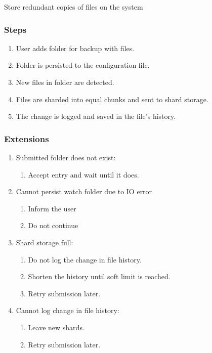 \documentclass[11pt, a4paper, twocolumn, twoside]{report}
\begin{document}
Store redundant copies of files on the system

\subsubsection{Steps}

\begin{enumerate}
 \item User adds folder for backup with files.
 \item Folder is persisted to the configuration file.
 \item New files in folder are detected.
 \item Files are sharded into equal chunks and sent to shard storage.
 \item The change is logged and saved in the file's history.
\end{enumerate}

\subsubsection{Extensions}
\begin{enumerate}
  \item Submitted folder does not exist:
	\begin{enumerate}
	  \item Accept entry and wait until it does.
	\end{enumerate}
  \item Cannot persist watch folder due to IO error
	\begin{enumerate}
	  \item Inform the user
	  \item Do not continue
	\end{enumerate}
  \item Shard storage full:
	\begin{enumerate}
	  \item Do not log the change in file history.
	  \item Shorten the history until soft limit is reached.
	  \item Retry submission later.
	\end{enumerate}
  \item Cannot log change in file history:
	\begin{enumerate}
	  \item Leave new shards.
	  \item Retry submission later.
	\end{enumerate}
\end{enumerate}
\end{document}
